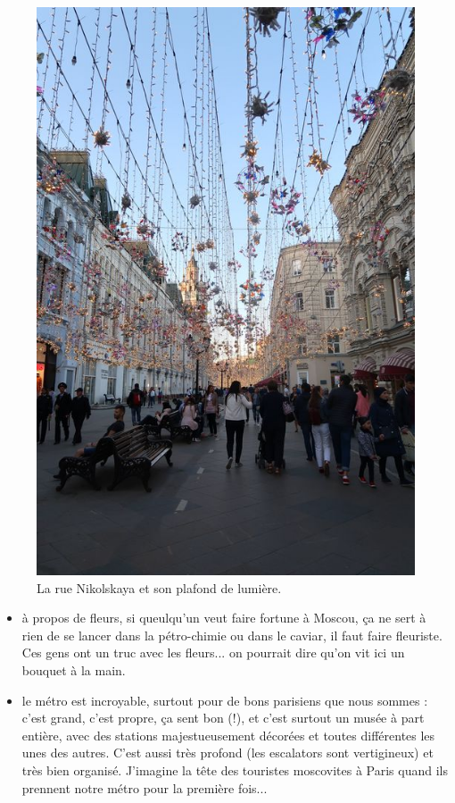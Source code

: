 \begin{figure}
\centering
\includegraphics{images/20180603_moscou.JPG}
\caption{La rue Nikolskaya et son plafond de lumière.}
\end{figure}

\begin{itemize}
\tightlist
\item
  à propos de fleurs, si queulqu'un veut faire fortune à Moscou, ça ne
  sert à rien de se lancer dans la pétro-chimie ou dans le caviar, il
  faut faire fleuriste. Ces gens ont un truc avec les fleurs... on
  pourrait dire qu'on vit ici un bouquet à la main.
\item
  le métro est incroyable, surtout pour de bons parisiens que nous
  sommes : c'est grand, c'est propre, ça sent bon (!), et c'est surtout
  un musée à part entière, avec des stations majestueusement décorées et
  toutes différentes les unes des autres. C'est aussi très profond (les
  escalators sont vertigineux) et très bien organisé. J'imagine la tête
  des touristes moscovites à Paris quand ils prennent notre métro pour
  la première fois...
\end{itemize}

